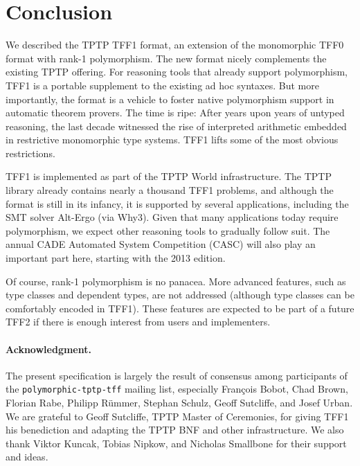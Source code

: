 \section{Conclusion}
\label{sec_concl}

We described the TPTP TFF1 format, an extension of the monomorphic TFF0 format
with rank-1 polymorphism. The new format nicely complements the existing TPTP
offering. %
For reasoning tools that already
support polymorphism, TFF1 is a portable supplement to the existing ad hoc
syntaxes. But more importantly, the format is a vehicle to foster native
polymorphism support in automatic theorem provers. The time is ripe: After years
upon years of untyped reasoning, the last decade witnessed the rise of
interpreted arithmetic embedded in restrictive monomorphic type systems. TFF1
lifts some of the most obvious restrictions.

TFF1 is implemented as part of the TPTP World infrastructure. The TPTP library
already contains nearly a thousand TFF1 problems, and although the format is
still in its infancy, it is supported by several applications, including the SMT
solver Alt-Ergo (via Why3). Given that many applications today require
polymorphism, we expect other reasoning tools to gradually follow suit. The
annual CADE Automated System Competition (CASC) will also play an important
part here, starting with the 2013 edition.

Of course, rank-1 polymorphism is no panacea. More advanced features, such as
type classes and dependent types, are not addressed (although type
classes can be comfortably encoded in TFF1). These features are expected to be
part of a future TFF2 if there is enough interest from users and implementers.

\def\ackname{Acknowledgment}
\paragraph{\textbf{\upshape\ackname.}}
%
The present specification is largely the result of consensus among
participants of the {\tt polymorphic-tptp-tff} mailing list, especially
Fran\c{c}ois Bobot, Chad Brown, Florian Rabe, Philipp R\"ummer, Stephan Schulz,
Geoff Sutcliffe, and Josef Urban.
We are grateful to Geoff Sutcliffe, TPTP Master of Ceremonies, for giving TFF1
his benediction and adapting the TPTP BNF and other infrastructure.
We also thank Viktor Kuncak, Tobias Nipkow, and Nicholas Smallbone for their
support and ideas.
